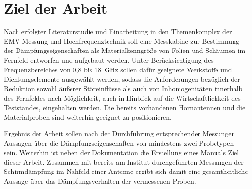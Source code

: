 \section{Ziel der Arbeit}\label{sec_1:Ziel_der_Arbeit}
Nach erfolgter Literaturstudie und Einarbeitung in den Themenkomplex der EMV-Messung und Hochfrequenztechnik soll eine Messkabine zur Bestimmung der Dämpfungseigenschaften als Materialkenngröße von Folien und Schäumen im Fernfeld entworfen und aufgebaut werden. Unter Berücksichtigung des Frequenzbereiches von 0,8 bis \SI{18}{\giga\hertz} sollen dafür geeignete Werkstoffe und Dichtungselemente ausgewählt werden, sodass die Anforderungen bezüglich der Reduktion sowohl äußerer Störeinflüsse als auch von Inhomogenitäten innerhalb des Fernfeldes nach Möglichkeit, auch in Hinblick auf die Wirtschaftlichkeit des Teststandes, eingehalten werden. Die bereits vorhandenen Hornantennen und die Materialproben sind weiterhin geeignet zu positionieren. \par
\vspace{\linespace}
Ergebnis der Arbeit sollen nach der Durchführung entsprechender Messungen Aussagen über die Dämpfungseigenschaften von mindestens zwei Probetypen sein. Weiterhin ist neben der Dokumentation die Erstellung eines Manuals Ziel dieser Arbeit. Zusammen mit bereits am Institut durchgeführten Messungen der Schirmdämpfung im Nahfeld einer Antenne ergibt sich damit eine gesamtheitliche Aussage über das Dämpfungsverhalten der vermessenen Proben.
